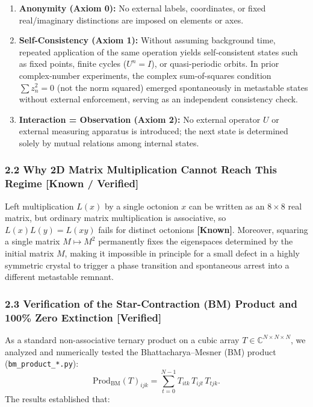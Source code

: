 \documentclass[
  a4paper,
]{article}
\providecommand{\tightlist}{%
  \setlength{\itemsep}{0pt}\setlength{\parskip}{0pt}}
\begin{document}
\begin{enumerate}
\def\labelenumi{\arabic{enumi}.}
\tightlist
\item
  \textbf{Anonymity (Axiom 0):} No external labels, coordinates, or
  fixed real/imaginary distinctions are imposed on elements or axes.
\item
  \textbf{Self-Consistency (Axiom 1):} Without assuming background time,
  repeated application of the same operation yields self-consistent
  states such as fixed points, finite cycles (\(U^n = I\)), or
  quasi-periodic orbits. In prior complex-number experiments, the
  complex sum-of-squares condition \(\sum z_n^2 = 0\) (not the norm
  squared) emerged spontaneously in metastable states without external
  enforcement, serving as an independent consistency check.
\item
  \textbf{Interaction = Observation (Axiom 2):} No external operator
  \(U\) or external measuring apparatus is introduced; the next state is
  determined solely by mutual relations among internal states.
\end{enumerate}

\subsubsection{2.2 Why 2D Matrix Multiplication Cannot Reach This Regime
{[}Known /
Verified{]}}\label{why-2d-matrix-multiplication-cannot-reach-this-regime-known-verified}

Left multiplication \(L(x)\) by a single octonion \(x\) can be written
as an \(8 \times 8\) real matrix, but ordinary matrix multiplication is
associative, so \(L(x)L(y) = L(xy)\) fails for distinct octonions
\textbf{{[}Known{]}}. Moreover, squaring a single matrix
\(M \mapsto M^2\) permanently fixes the eigenspaces determined by the
initial matrix \(M\), making it impossible in principle for a small
defect in a highly symmetric crystal to trigger a phase transition and
spontaneous arrest into a different metastable remnant.

\subsubsection{2.3 Verification of the Star-Contraction (BM) Product and
100\% Zero Extinction
{[}Verified{]}}\label{verification-of-the-star-contraction-bm-product-and-100-zero-extinction-verified}

As a standard non-associative ternary product on a cubic array
\(T \in \mathbb{C}^{N \times N \times N}\), we analyzed and numerically
tested the Bhattacharya--Mesner (BM) product
(\texttt{bm\_\allowbreak{}product\_\allowbreak{}*.py}):
\[\mathrm{Prod}_{\mathrm{BM}}(T)_{ijk} = \sum_{t=0}^{N-1} T_{itk}\, T_{ijt}\, T_{tjk}.\]
The results established that:
\end{document}
